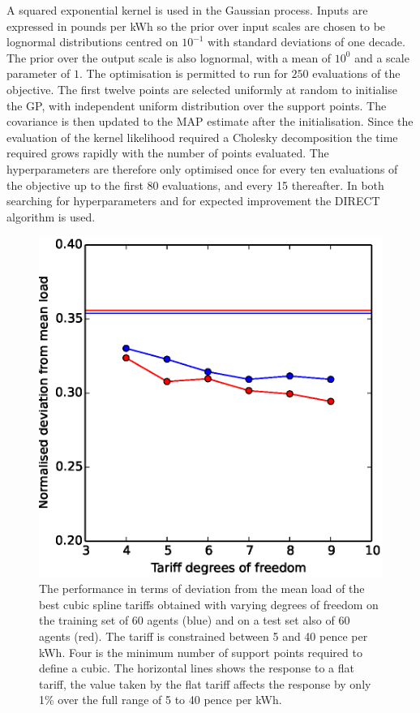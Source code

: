 \documentclass[a4paper, 10 pt, conference]{ieeeconf}  %
\begin{document}
A squared exponential kernel is used in the Gaussian process. Inputs are expressed in pounds per kWh so the  prior over input scales are chosen to be lognormal distributions centred on $10^{-1}$ with standard deviations of one decade. The prior over the output scale is also lognormal, with a mean of $10^0$ and a scale parameter of $1$. The optimisation is permitted to run for $250$ evaluations of the objective. The first twelve points are selected uniformly at random to initialise the GP, with independent uniform distribution over the support points. The covariance is then updated to the MAP estimate after the initialisation. Since the evaluation of the kernel likelihood required a Cholesky decomposition the time required grows rapidly with the number of points evaluated. The hyperparameters are therefore only optimised once for every ten evaluations of the objective up to the first 80 evaluations, and every 15 thereafter. In both searching for hyperparameters and for expected improvement the DIRECT algorithm is used.

\begin{figure}[htb]
\centering
\includegraphics[width=\columnwidth,trim =0cm 0cm 0cm 0cm,clip=True]{f2.eps}
\caption{The performance in terms of deviation from the mean load of the best cubic spline tariffs obtained with varying degrees of freedom on the training set of 60 agents (blue) and on a test set also of 60 agents (red). The tariff is constrained between 5 and 40 pence per kWh. Four is the minimum number of support points required to define a cubic. The horizontal lines shows the response to a flat tariff, the value taken by the flat tariff affects the response by only 1\% over the full range of 5 to 40 pence per kWh.}
\label{DOFplot}
\end{figure}
\end{document}
